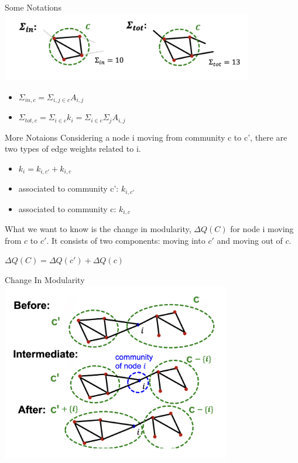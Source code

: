 \documentclass[12pt]{beamer}
\begin{document}
\begin{frame}{Some Notations}
\centering
\includegraphics[width=11cm]{img/img4.png}
\begin{itemize}
    \item $\Sigma_{in, c} = \Sigma_{i, j\in c}A_{i, j}$
    \item $\Sigma_{tot, c} = \Sigma_{i\in c}k_i = \Sigma_{i\in c}\Sigma_{j}A_{i, j}$
\end{itemize}
\end{frame}


\begin{frame}{More Notaions}
Considering a node i moving from community c to c’, there are two types of edge weights related to i.
\begin{itemize}
    \item $k_i = k_{i, c'} + k_{i, c}$
    \item associated to community c’: $k_{i, c'}$
    \item associated to community c: $k_{i, c}$
\end{itemize}
What we want to know is the change in modularity, $\Delta Q(C)$ for node i
moving from $c$ to $c'$. It consists of two components: moving into $c'$ and
moving out of $c$.

$\Delta Q(C) = \Delta Q(c') + \Delta Q(c)$
\end{frame}


\begin{frame}{Change In Modularity}
\centering
\includegraphics[width=10cm]{img/img5.png}
\end{frame}
\end{document}
